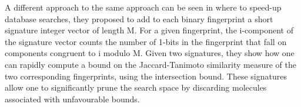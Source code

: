 A different approach to the same approach can be seen in \citet*{nasr2010hashing} where to speed-up database searches, they proposed to add to each binary fingerprint a short signature integer vector of length M. For a given fingerprint, the i-component of the signature vector counts the number of 1-bits in the fingerprint that fall on components congruent to i modulo M. Given two signatures, they show how one can rapidly compute a bound on the Jaccard-Tanimoto similarity measure of the two corresponding fingerprints, using the intersection bound. These signatures allow one to significantly prune the search space by discarding molecules associated with unfavourable bounds. \\

